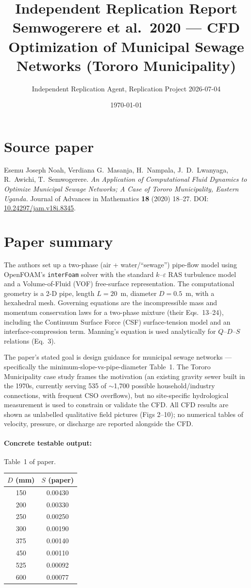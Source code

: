 \documentclass[11pt,a4paper]{article}
\title{Independent Replication Report\\
\large Semwogerere et al.\ 2020 --- CFD Optimization of Municipal Sewage Networks
(Tororo Municipality)}
\author{Independent Replication Agent, Replication Project 2026-07-04}
\date{\today}
\begin{document}
\maketitle

\section*{Source paper}
Esemu Joseph Noah, Verdiana G.\ Masanja, H.\ Nampala, J.\ D.\ Lwanyaga,
R.\ Awichi, T.\ Semwogerere. \emph{An Application of Computational Fluid Dynamics
to Optimize Municipal Sewage Networks; A Case of Tororo Municipality, Eastern
Uganda.} Journal of Advances in Mathematics \textbf{18} (2020) 18--27.
DOI: \href{https://doi.org/10.24297/jam.v18i.8345}{10.24297/jam.v18i.8345}.

\section{Paper summary}
The authors set up a two-phase (air + water/``sewage'') pipe-flow model using
OpenFOAM's \texttt{interFoam} solver with the standard $k$--$\varepsilon$ RAS
turbulence model and a Volume-of-Fluid (VOF) free-surface representation.
The computational geometry is a 2-D pipe, length $L=20$~m, diameter
$D=0.5$~m, with a hexahedral mesh. Governing equations are the incompressible
mass and momentum conservation laws for a two-phase mixture (their Eqs.\
13--24), including the Continuum Surface Force (CSF) surface-tension model
and an interface-compression term. Manning's equation is used analytically
for $Q$--$D$--$S$ relations (Eq.\ 3).

The paper's stated goal is design guidance for municipal sewage networks ---
specifically the minimum-slope-vs-pipe-diameter Table~1. The Tororo
Municipality case study frames the motivation (an existing gravity sewer
built in the 1970s, currently serving 535 of \(\sim\)1{,}700 possible
household/industry connections, with frequent CSO overflows), but no
site-specific hydrological measurement is used to constrain or validate
the CFD. All CFD results are shown as unlabelled qualitative field pictures
(Figs 2--10); no numerical tables of velocity, pressure, or discharge are
reported alongside the CFD.

\paragraph{Concrete testable output:} Table~1 of paper.
\begin{center}
\begin{tabular}{cc}
\toprule
$D$ (mm) & $S$ (paper) \\
\midrule
150 & 0.00430 \\
200 & 0.00330 \\
250 & 0.00250 \\
300 & 0.00190 \\
375 & 0.00140 \\
450 & 0.00110 \\
525 & 0.00092 \\
600 & 0.00077 \\
\bottomrule
\end{tabular}
\end{center}
\end{document}
